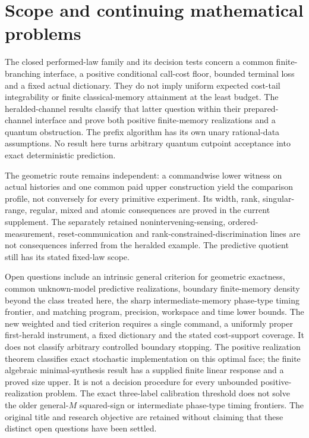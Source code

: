 \section{Scope and continuing mathematical problems}\label{sec:r66-scope}
The closed performed-law family and its decision tests concern a common finite-branching interface, a positive conditional call-cost floor, bounded terminal loss and a fixed actual dictionary. They do not imply uniform expected cost-tail integrability or finite classical-memory attainment at the least budget. The heralded-channel results classify that latter question within their prepared-channel interface and prove both positive finite-memory realizations and a quantum obstruction. The prefix algorithm has its own unary rational-data assumptions. No result here turns arbitrary quantum cutpoint acceptance into exact deterministic prediction.

The geometric route remains independent: a commandwise lower witness on actual histories and one common paid upper construction yield the comparison profile, not conversely for every primitive experiment. Its width, rank, singular-range, regular, mixed and atomic consequences are proved in the current supplement. The separately retained nonintervening-sensing, ordered-measurement, reset-communication and rank-constrained-discrimination lines are not consequences inferred from the heralded example. The predictive quotient still has its stated fixed-law scope.

Open questions include an intrinsic general criterion for geometric exactness, common unknown-model predictive realizations, boundary finite-memory density beyond the class treated here, the sharp intermediate-memory phase-type timing frontier, and matching program, precision, workspace and time lower bounds. The new weighted and tied criterion requires a single command, a uniformly proper first-herald instrument, a fixed dictionary and the stated cost-support coverage. It does not classify arbitrary controlled boundary stopping. The positive realization theorem classifies exact stochastic implementation on this optimal face; the finite algebraic minimal-synthesis result has a supplied finite linear response and a proved size upper. It is not a decision procedure for every unbounded positive-realization problem. The exact three-label calibration threshold does not solve the older general-$M$ squared-sign or intermediate phase-type timing frontiers. The original title and research objective are retained without claiming that these distinct open questions have been settled.


